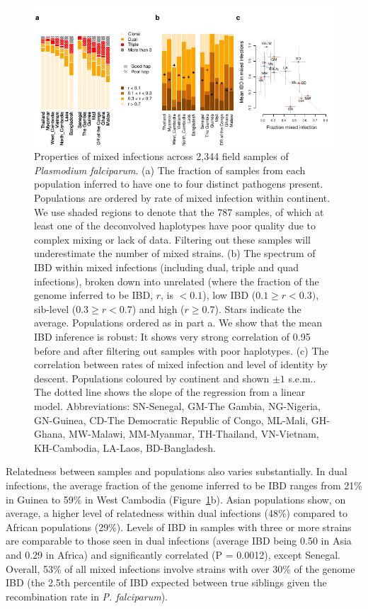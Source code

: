 \documentclass[9pt,lineno]{elife}
\begin{document}
\begin{figure}[h]
  \begin{center}
    \includegraphics[width=\textwidth]{Fig3.pdf}
    \caption{Properties of mixed infections across 2,344 field samples of {\it Plasmodium falciparum}. (a) The fraction of samples from each population inferred to have one to four distinct pathogens present.  Populations are ordered by rate of mixed infection within continent. We use shaded regions to denote that the 787 samples, of which at least one of the deconvolved haplotypes have poor quality due to complex mixing or lack of data. Filtering out these samples will underestimate the number of mixed strains. (b) The spectrum of IBD within mixed infections (including dual, triple and quad infections), broken down into unrelated (where the fraction of the genome inferred to be IBD, $r$, is $< 0.1$), low IBD ($0.1 \geq r < 0.3)$, sib-level ($0.3 \geq r<0.7$) and high ($r \geq 0.7$). Stars indicate the average.  Populations ordered as in part a. We show that the mean IBD inference is robust: It shows very strong correlation of 0.95 before and after filtering out samples with poor haplotypes. (c) The correlation between rates of mixed infection and level of identity by descent. Populations coloured by continent and shown $\pm 1$ s.e.m..  The dotted line shows the slope of the regression from a linear model.  Abbreviations: SN-Senegal, GM-The Gambia, NG-Nigeria, GN-Guinea, CD-The Democratic Republic of Congo, ML-Mali, GH-Ghana, MW-Malawi, MM-Myanmar, TH-Thailand, VN-Vietnam, KH-Cambodia, LA-Laos, BD-Bangladesh.} \label{fig:mixInfPlot}
  \end{center}
\end{figure}


Relatedness between samples and populations also varies substantially.  In dual infections, the average fraction of the genome inferred to be IBD ranges from 21\% in Guinea to 59\% in West Cambodia (Figure~\ref{fig:mixInfPlot}b).   Asian populations show, on average, a higher level of relatedness within dual infections (48\%) compared to African populations (29\%).  Levels of IBD in samples with three or more strains are comparable to those seen in dual infections (average IBD being 0.50 in Asia and 0.29 in Africa) and significantly correlated (P = 0.0012), except Senegal.  Overall, 53\% of all mixed infections involve strains with over 30\% of the genome IBD (the 2.5th percentile of IBD expected between true siblings given the recombination rate in {\it P. falciparum}).
\end{document}
